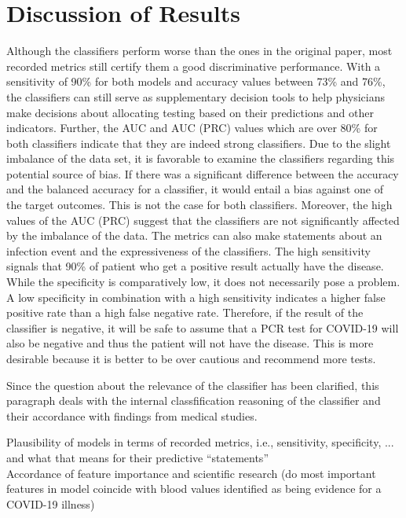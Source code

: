 \section{Discussion of Results}
Although the classifiers perform worse than the ones in the original paper, 
most recorded metrics still certify them a good discriminative performance.
With a sensitivity of 90\% for both models and accuracy values between 73\% and 
76\%, the classifiers can still serve as supplementary decision tools to help 
physicians make decisions about allocating testing based on their predictions 
and other indicators. Further, the AUC and AUC (PRC) values which are over 80\% 
for both classifiers indicate that they are indeed strong classifiers.
Due to the slight imbalance of the data set, it is  favorable to examine the 
classifiers regarding this potential source of bias. If there was a significant 
difference between the accuracy and the balanced accuracy for a classifier, it 
would entail a bias against one of the target outcomes. This is not the case 
for both classifiers. Moreover, the high values of the AUC (PRC) suggest that 
the classifiers are not significantly affected by the imbalance of the data.
The metrics can also make statements about an infection event and the 
expressiveness of the classifiers. The high sensitivity signals that 90\% of 
patient who get a positive result actually have the disease. While the 
specificity is comparatively low, it does not necessarily pose a problem. A low 
specificity in combination with a high sensitivity indicates a higher false 
positive rate than a high false negative rate.\cite{RN168}
Therefore, if the result of the classifier is negative, it will be safe to 
assume that a PCR test for COVID-19 will also be negative and thus the patient 
will not have the disease.
This is more desirable because it is better to be over cautious and recommend 
more tests.
\par
Since the question about the relevance of the classifier has been clarified, 
this paragraph deals with the internal classfification reasoning of the 
classifier and their accordance with findings from medical studies.
\begin{changemargin}{50pt}{50pt}
 Plausibility of models in terms of recorded metrics, i.e., sensitivity, 
specificity, ... and what that means for their predictive ``statements''
\\
Accordance of feature importance and scientific research (do most important 
features in model coincide with blood values identified as being evidence for a 
COVID-19 illness)
\end{changemargin}
